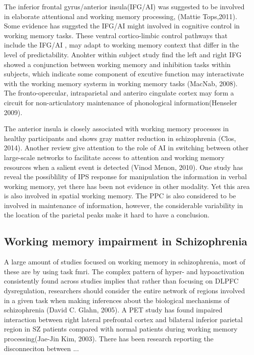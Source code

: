 \documentclass[preprint,authoryear,review,12pt,times]{elsarticle}
\begin{document}
The inferior frontal gyrus/anterior insula(IFG/AI) was suggested to be involved in elaborate attentional and working memory processing,  (Mattie Tops,2011). Some evidence has suggsted the IFG/AI might involved in cognitive control in working memory tasks. These ventral cortico-limbic control pathways that include the IFG/AI , may adapt to working memory context that differ in the level of predictability. Anohter within subject study find the left and right IFG showed a conjunction between working memory and inhibition tasks within subjects, which indicate some component of excutive function may interactivate with the working memory systerm in working memory tasks (MacNab, 2008). The fronto-opercular, intraparietal and anteriro cingulate cortex may form a circuit for non-articulatory maintenance of phonological information(Henseler 2009).  

The anterior insula is closely associated with working memory processes in healthy participants and shows gray matter reduction in schizophrenia (Clos, 2014). Another review give attention to the role of AI in switching between other large-scale networks to facilitate access to attention and working memory resources when a salient event is detected (Vinod Menon, 2010). One study has reveal the possiblility of IPS response for manipulation the information in verbal working memory, yet there has been not evidence in other modality. Yet this area is also involved in spatial working memory. The PPC is also considered to be involved in maintenance of information, however, the considerable variability in the location of the parietal peaks make it hard to have a conclusion.



\subsection*{Working memory impairment in Schizophrenia}


A large amount of studies focused on working memory in schizophrenia, most of these are by using task fmri.  The complex pattern of hyper- and hypoactivation consistently found across studies implies that rather than focusing on DLPFC dysregulation, researchers should consider the entire network of regions involved in a given task when making inferences about the biological mechanisms of schizophrenia (David C. Glahn, 2005). A PET study has found impaired interaction between right lateral prefrontal cortex and bilateral inferior parietal region in SZ patients compared with normal patients during working memory processing(Jae-Jin Kim, 2003). There has been research reporting the disconneciton between ...
\end{document}
